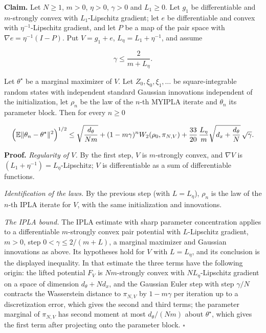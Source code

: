 \documentclass[11pt,a4paper]{article}
\begin{document}
\textbf{Claim.} Let \(N\ge1\), \(m>0\), \(\eta>0\), \(\gamma>0\) and \(L_1\ge0\). Let \(g_1\) be differentiable and \(m\)-strongly convex with \(L_1\)-Lipschitz gradient; let \(e\) be differentiable and convex with \(\eta^{-1}\)-Lipschitz gradient, and let \(P\) be a map of the pair space with \(\nabla e=\eta^{-1}(I-P)\). Put \(V=g_1+e\), \(L_\eta=L_1+\eta^{-1}\), and assume


\[\gamma\le\frac{2}{m+L_\eta}.\]


Let \(\theta^\star\) be a marginal maximizer of \(V\). Let \(Z_0,\xi_0,\xi_1,\dots\) be square-integrable random states with independent standard Gaussian innovations independent of the initialization, let \(\rho_n\) be the law of the \(n\)-th MYIPLA iterate and \(\theta_n\) its parameter block. Then for every \(n\ge0\)


\[\Bigl(\mathbb E\|\theta_n-\theta^\star\|^2\Bigr)^{1/2}\le\sqrt{\frac{d_\theta}{Nm}}+(1-m\gamma)^nW_2(\rho_0,\pi_{N,V})+\frac{33}{20}\,\frac{L_\eta}{m}\sqrt{d_x+\frac{d_\theta}{N}}\,\sqrt\gamma .\]


\textbf{Proof.} \emph{Regularity of \(V\).} By the first step, \(V\) is \(m\)-strongly convex, and \(\nabla V\) is \((L_1+\eta^{-1})=L_\eta\)-Lipschitz; \(V\) is differentiable as a sum of differentiable functions.




\emph{Identification of the laws.} By the previous step (with \(L=L_\eta\)), \(\rho_n\) is the law of the \(n\)-th IPLA iterate for \(V\), with the same initialization and innovations.




\emph{The IPLA bound.} The IPLA estimate with sharp parameter concentration \cite[Section~3.6.2]{LangevinLean2026Proximal} applies to a differentiable \(m\)-strongly convex pair potential with \(L\)-Lipschitz gradient, \(m>0\), step \(0<\gamma\le2/(m+L)\), a marginal maximizer and Gaussian innovations as above. Its hypotheses hold for \(V\) with \(L=L_\eta\), and its conclusion is the displayed inequality. In that estimate the three terms have the following origin: the lifted potential \(F_V\) is \(Nm\)-strongly convex with \(NL_\eta\)-Lipschitz gradient on a space of dimension \(d_\theta+Nd_x\), and the Gaussian Euler step with step \(\gamma/N\) contracts the Wasserstein distance to \(\pi_{N,V}\) by \(1-m\gamma\) per iteration up to a discretization error, which gives the second and third terms; the parameter marginal of \(\pi_{N,V}\) has second moment at most \(d_\theta/(Nm)\) about \(\theta^\star\), which gives the first term after projecting onto the parameter block. \(\square\)
\end{document}
